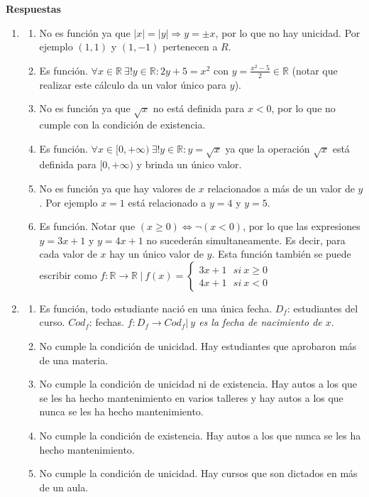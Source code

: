 \documentclass[a4paper]{article}
\newcommand{\exercise}{\item}
\newcommand{\Then}{\Rightarrow}
\newcommand{\Eq}{\Leftrightarrow}
\begin{document}
 \textbf{Respuestas}\begin{enumerate}\exercise\begin{enumerate} [label=(\alph*)]		\item No es función ya que $|x|=|y| \Then y=\pm x$, por lo que no hay unicidad. Por ejemplo $(1,1)$ y $(1,-1)$ pertenecen a $R$.
		\item Es función. $\forall x\in\mathbb{R} ~\exists ! y \in \mathbb{R}: 2y+5=x^2$ con $y=\frac{x^2-5}{2}\in\mathbb{R}$ (notar que realizar este cálculo da un valor único para $y$). 
		\item No es función ya que $\sqrt{x}$ no está definida para $x<0$, por lo que no cumple con la condición de existencia.
		\item Es función. $\forall x\in [0,+\infty) ~\exists ! y \in \mathbb{R}: y=\sqrt{x}$ ya que la operación $\sqrt{x}$ está definida para $[0,+\infty)$ y brinda un único valor.
		\item No es función ya que hay valores de $x$ relacionados a más de un valor de $y$. Por ejemplo $x=1$ está relacionado a $y=4$ y $y=5$.
		\item Es función. Notar que $(x\geq0) \Eq \neg(x<0)$, por lo que las expresiones $y=3x+1$ y $y=4x+1$ no sucederán simultaneamente. Es decir, para cada valor de $x$ hay un único valor de $y$. Esta función también se puede escribir como $f: \mathbb{R} \to \mathbb{R} ~|~ f(x)=\left\{\begin{matrix}3x+1 ~~~si~ x\geq0\\ 4x+1 ~~~si~ x<0\end{matrix}\right.$
\end{enumerate}\exercise\begin{enumerate} [label=(\alph*)]		\item Es función, todo estudiante nació en una única fecha. $D_f$: estudiantes del curso. $Cod_f$: fechas. $f:D_f \to Cod_f|~$\textit{$y$ es la fecha de nacimiento de $x$}.
		\item No cumple la condición de unicidad. Hay estudiantes que aprobaron más de una materia.
		\item No cumple la condición de unicidad ni de existencia. Hay autos a los que se les ha hecho mantenimiento en varios talleres y hay autos a los que nunca se les ha hecho mantenimiento.
		\item No cumple la condición de existencia. Hay autos a los que nunca se les ha hecho mantenimiento.
		\item No cumple la condición de unicidad. Hay cursos que son dictados en más de un aula.

\end{enumerate}
\end{enumerate}
\end{document}
